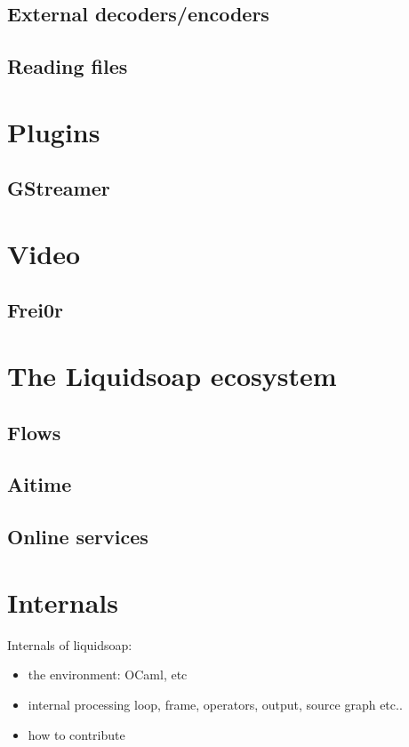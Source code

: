 \documentclass{book}
\begin{document}
\section{External decoders/encoders}

\section{Reading files}

\chapter{Plugins}
\section{GStreamer}

\chapter{Video}

\section{Frei0r}

\chapter{The Liquidsoap ecosystem}
\section{Flows}

\section{Aitime}

\section{Online services}

\chapter{Internals}
Internals of liquidsoap:
\begin{itemize}
\item the environment: OCaml, etc
\item internal processing loop, frame, operators, output, source graph etc..
\item how to contribute
\end{itemize}
\end{document}
